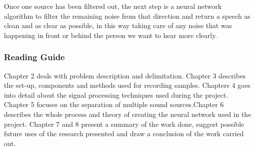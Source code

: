 Once one source has been filtered out, the next step is a neural network algorithm to filter the remaining 
noise from that direction and return a speech as clean and as clear as possible, in this way taking care of 
any noise that was happening in front or behind the person we want to hear more clearly.
\subsubsection{Reading Guide}
Chapter 2 deals with problem description and delimitation. 
Chapter 3 describes the set-up, components and methods used for recording samples.
Chapters 4 goes into detail about the signal processing techniques used during the project. Chapter 5 focuses on the separation of multiple sound sources.Chapter 6 describes the whole process and theory of creating the neural network used in the project. Chapter 7 and 
8 present a summary of the work done, suggest possible future uses of the research 
presented and draw a conclusion of the work carried out.